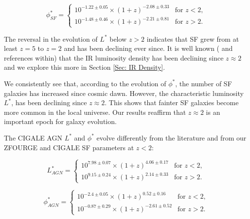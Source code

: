 \begin{equation*}
    \phi^{*}_{SF} =
    \begin{cases} 
        10^{-1.22 \pm 0.05} \times (1+z)^{-2.08 \pm 0.33} & \text{for } z < 2, \\
        10^{-1.48 \pm 0.46} \times (1+z)^{-2.21 \pm 0.81} & \text{for } z > 2.
    \end{cases}
\end{equation*}

The reversal in the evolution of $L^{*}$ below $z>2$ indicates that SF grew from at least $z=5$ to $z=2$ and has been declining ever since. It is well known (\citealp{gruppioni_herschel_2013,  madau_cosmic_2014} and references within) that the IR luminosity density has been declining since $z\approx2$ and we explore this more in Section \ref{Sec: IR Density}. 

We consistently see that, according to the evolution of $\phi^{*}$, the number of SF galaxies has increased since cosmic dawn. However, the characteristic luminosity $L^{*}$, has been declining since $z\approx2$. This shows that fainter SF galaxies become more common in the local universe. Our results reaffirm that $z\approx2$ is an important epoch for galaxy evolution.

The CIGALE AGN $L^{*}$ and $\phi^{*}$ evolve differently from the literature and from our ZFOURGE and CIGALE SF parameters at $z<2$:

\begin{equation*}
    L^{*}_{AGN} =
    \begin{cases} 
        10^{7.98 \pm 0.07} \times (1+z)^{4.06 \pm 0.17} & \text{for } z < 2, \\
        10^{9.15 \pm 0.24} \times (1+z)^{2.14 \pm 0.33} & \text{for } z > 2.
    \end{cases}
\end{equation*}

\begin{equation*}
    \phi^{*}_{AGN} =
    \begin{cases} 
        10^{-2.4 \pm 0.05} \times (1+z)^{0.52 \pm 0.16} & \text{for } z < 2, \\
        10^{-0.87 \pm 0.29} \times (1+z)^{-2.61 \pm 0.52} & \text{for } z > 2.
    \end{cases}
\end{equation*}

